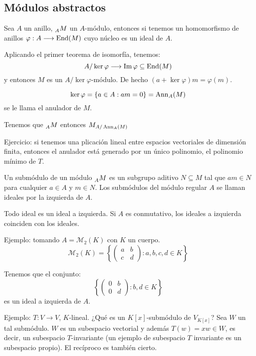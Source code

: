 \subsection{Módulos abstractos}

Sea \(A\) un anillo, \(\prescript{}{A}{M}\) un \(A\)-módulo,
entonces si tenemos
un homomorfismo de anillos \(\varphi:A\longrightarrow\operatorname{End}(M)\)
cuyo núcleo es un ideal de \(A\).

Aplicando el primer teorema de isomorfía, tenemos:
\[
  A/\ker\varphi\longrightarrow\Im\varphi\subseteq\operatorname{End}(M)
\]
y entonces \(M\) es un \(A/\ker\varphi\)-módulo.
De hecho \((a+\ker\varphi)m=\varphi(m)\).

\[
  \ker\varphi=\{a\in A: am=0\}=\operatorname{Ann}_A(M)
\]
se le llama el anulador de \(M\).

Tenemos que \(\prescript{}{A}{M}\) entonces \(M_{A/\operatorname{Ann}_A(M)}\)

Ejercicio: si tenemos una plicación lineal entre espacios vectoriales
de dimensión finita, entonces el anulador está generado por un único
polinomio, el polinomio mínimo de \(T\).

\begin{df}
  Un submódulo de un módulo
  \(\prescript{}{A}{M}\) es un subgrupo aditivo \(N\subseteq M\)
  tal que \(am\in N\) para cualquier \(a\in A\) y \(m\in N\). Los
  submódulos del módulo regular \(A\) se llaman ideales por la izquierda
  de \(A\).
\end{df}

\begin{obs}
  Todo ideal es un ideal a izquierda. Si \(A\) es conmutativo, los ideales
  a izquierda coinciden con los ideales.
\end{obs}

Ejemplo: tomando \(A=\mathcal{M}_2(K)\) con \(K\) un cuerpo.
\[
  \mathcal{M}_2(K)=\left\{
    \begin{pmatrix}
      a&b\\
      c&d
    \end{pmatrix}:
    a,b,c,d\in K
  \right\}
\]

Tenemos que el conjunto:
\[
  \left\{
    \begin{pmatrix}
      0&b\\
      0&d
    \end{pmatrix}:
    b,d\in K
  \right\}
\]
es un ideal a izquierda de \(A\).

Ejemplo: \(T:V\longrightarrow V\), \(K\)-lineal.
¿Qué es un \(K[x]\)-submódulo de \(V_{K[x]}\)?
Sea \(W\) un tal submódulo.
\(W\) es un subespacio vectorial y además \(T(w)=xw\in W\),
es decir, un subespacio \(T\)-invariante (un ejemplo
de subespacio \(T\) invariante es un subespacio propio).
El recíproco es también cierto.


